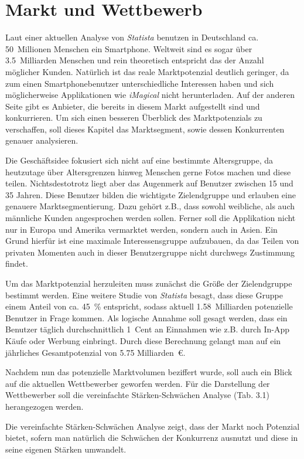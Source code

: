 \chapter{Markt und Wettbewerb}
Laut einer aktuellen Analyse von \textit{Statista} benutzen in Deutschland ca. 50~Millionen Menschen ein Smartphone. Weltweit sind es sogar über 3.5~Milliarden Menschen und rein theoretisch entspricht das der Anzahl möglicher Kunden. Natürlich ist das reale Marktpotenzial deutlich geringer, da zum einen Smartphonebenutzer unterschiedliche Interessen haben und sich möglicherweise Applikationen wie \textit{iMagical} nicht herunterladen. Auf der anderen Seite gibt es Anbieter, die bereits in diesem Markt aufgestellt sind und konkurrieren. Um sich einen besseren Überblick des Marktpotenzials zu verschaffen, soll dieses Kapitel das Marktsegment, sowie dessen Konkurrenten genauer analysieren.

Die Geschäftsidee fokusiert sich nicht auf eine bestimmte Altersgruppe, da heutzutage über Altersgrenzen hinweg Menschen gerne Fotos machen und diese teilen. Nichtsdestotrotz liegt aber das Augenmerk auf Benutzer zwischen 15 und 35 Jahren. Diese Benutzer bilden die wichtigste Zielendgruppe und erlauben eine genauere Marktsegmentierung. Dazu gehört z.B., dass sowohl weibliche, als auch männliche Kunden angesprochen werden sollen. Ferner soll die Applikation nicht nur in Europa und Amerika vermarktet werden, sondern auch in Asien. Ein Grund hierfür ist eine maximale Interessensgruppe aufzubauen, da das Teilen von privaten Momenten auch in dieser Benutzergruppe nicht durchwegs Zustimmung findet.

Um das Marktpotenzial herzuleiten muss zunächst die Größe der Zielendgruppe bestimmt werden. Eine weitere Studie von \textit{Statista} besagt, dass diese Gruppe einem Anteil von ca. 45~\% entspricht, sodass aktuell 1.58~Milliarden potenzielle Benutzer in Frage kommen. Als logische Annahme soll gesagt werden, dass ein Benutzer täglich durchschnittlich 1~Cent an Einnahmen wie z.B. durch In-App Käufe oder Werbung einbringt. Durch diese Berechnung gelangt man auf ein jährliches Gesamtpotenzial von 5.75 Milliarden~€.

Nachdem nun das potenzielle Marktvolumen beziffert wurde, soll auch ein Blick auf die aktuellen Wettbewerber geworfen werden. Für die Darstellung der Wettbewerber soll die vereinfachte Stärken-Schwächen Analyse (Tab. 3.1) herangezogen werden.

Die vereinfachte Stärken-Schwächen Analyse zeigt, dass der Markt noch Potenzial bietet, sofern man natürlich die Schwächen der Konkurrenz ausnutzt und diese in seine eigenen Stärken umwandelt.

